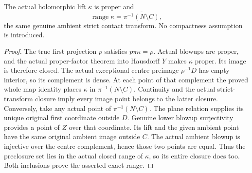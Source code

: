 \begin{theorem}
\label{hir:actual-plane-contact-blowup-whole-strict-image}
\leanok
The actual holomorphic lift $\kappa$ is proper and
\[
 \operatorname{range}\kappa=\overline{\pi^{-1}(N\setminus C)},
\]
the same genuine ambient strict contact transform. No compactness assumption
is introduced.
\end{theorem}
\begin{proof}
The true first projection $p$ satisfies $p\pi\kappa=\rho$. Actual blowups
are proper, and the actual proper-factor theorem into Hausdorff $Y$
makes $\kappa$ proper. Its image is therefore closed. The actual
exceptional-centre preimage $\rho^{-1}D$ has empty interior, so its
complement is dense. At each point of that complement the proved whole
map identity places $\kappa$ in $\pi^{-1}(N\setminus C)$. Continuity
and the actual strict-transform closure imply every image point belongs
to the latter closure. Conversely, take any actual point of
$\pi^{-1}(N\setminus C)$. The plane relation supplies its unique original
first coordinate outside $D$. Genuine lower blowup surjectivity provides
a point of $Z$ over that coordinate. Its lift and the given ambient point
have the same original ambient image outside $C$. The actual ambient
blowup is injective over the centre complement, hence those two points
are equal. Thus the preclosure set lies in the actual closed range of
$\kappa$, so its entire closure does too. Both inclusions prove the
asserted exact range.
\end{proof}

